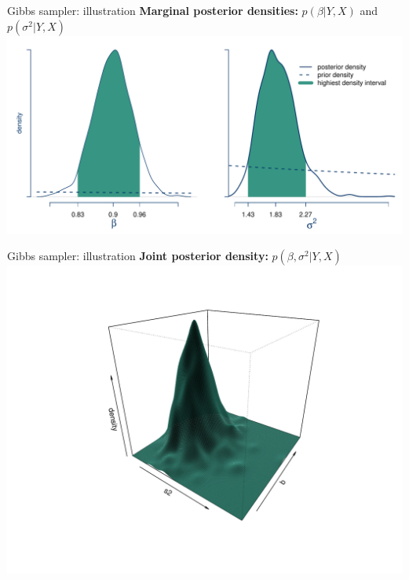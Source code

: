 \documentclass[notes,blackandwhite,mathsans]{beamer}
\begin{document}
{
\begin{frame}{Gibbs sampler: illustration}
\centering
\textbf{Marginal posterior densities:} $p(\beta|Y,X)$ and $p\left(\sigma^2|Y,X\right)$\\
\includegraphics[scale=0.45]{./grphs/bs-marginal.pdf}

\end{frame}
}

{
\begin{frame}{Gibbs sampler: illustration}
\centering
\textbf{Joint posterior density:} $p\left(\beta,\sigma^2|Y,X\right)$\\
\includegraphics[scale=0.45, trim=0cm 3cm 0cm 2cm]{./grphs/bs-joint.pdf}

\end{frame}
}
\end{document}
